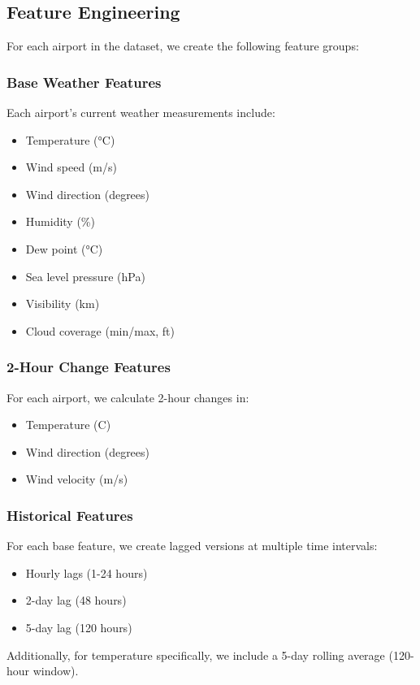 \subsection{Feature Engineering}
For each airport in the dataset, we create the following feature groups:

\subsubsection{Base Weather Features}
Each airport's current weather measurements include:
\begin{itemize}
  \item Temperature (°C)
  \item Wind speed (m/s)
  \item Wind direction (degrees)
  \item Humidity (\%)
  \item Dew point (°C)
  \item Sea level pressure (hPa)
  \item Visibility (km)
  \item Cloud coverage (min/max, ft)
\end{itemize}

\subsubsection{2-Hour Change Features}
For each airport, we calculate 2-hour changes in:
\begin{itemize}
  \item Temperature (\textdegree C)
  \item Wind direction (degrees)
  \item Wind velocity (m/s)
\end{itemize}

\subsubsection{Historical Features}
For each base feature, we create lagged versions at multiple time intervals:
\begin{itemize}
  \item Hourly lags (1-24 hours)
  \item 2-day lag (48 hours)
  \item 5-day lag (120 hours)
\end{itemize}
Additionally, for temperature specifically, we include a 5-day rolling average (120-hour window).

